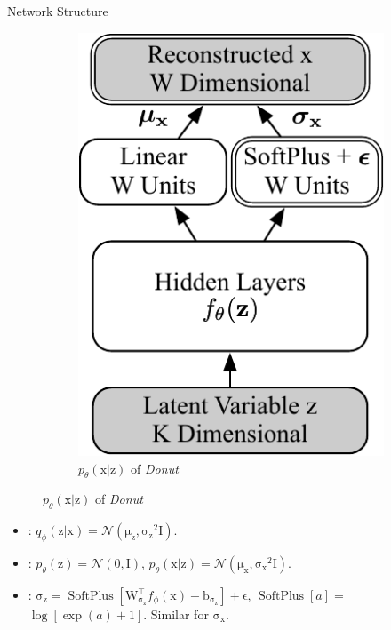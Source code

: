 \documentclass[usenames,dvipsnames]{beamer}
\newcommand{\DONUT}{\textit{Donut}}
\newcommand{\vv}[1]{\bm{\mathrm{{#1}}}}
\begin{document}
\begin{frame}{Network Structure}
\begin{figure}
    \begin{subfigure}[t]{.33\columnwidth}
      \centering
      \includegraphics[height=.45\textheight]{generative-net}
      \caption{$p_{\theta}(\vv{x}|\vv{z})$ of \DONUT{}}
    \end{subfigure}
  \end{figure}
  
  \begin{itemize}\setlength\itemsep{.2em}
    \item {}: $q_{\phi}(\vv{z}|\vv{x})=\mathcal{N}(\vv{\mu_z},\vv{\sigma_z}^2\vv{I})$.
    \item {}: $p_{\theta}(\vv{z})=\mathcal{N}(\vv{0},\vv{I})$,
      $p_{\theta}(\vv{x}|\vv{z})=\mathcal{N}(\vv{\mu_x},\vv{\sigma_x}^2\vv{I})$.
    \item {}: $\vv{\sigma_z} = \operatorname{SoftPlus}[\vv{W}^{\top}_{\vv{\sigma_z}}f_{\phi}(\vv{x})+\vv{b_{\sigma_z}}] + \vv{\epsilon}$, $\operatorname{SoftPlus}[a] = \;$ $\log [\exp (a) + 1]$.  Similar for $\vv{\sigma_x}$.
  \end{itemize}
\end{frame}
\end{document}
